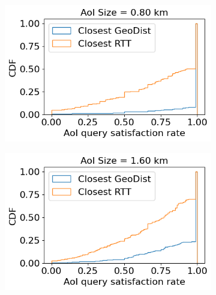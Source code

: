 \begin{figure}
\begin{subfigure}{0.3\textwidth}
  \caption{}
\end{subfigure}
\begin{subfigure}{0.333\textwidth}
  \centering
  \includegraphics[width=\linewidth]{figures/mechanisms/spatial_ctx_mgmt/aoi_satisfaction_rate_cdf_AOI_0.800_km.png}
  \caption{}
\end{subfigure}%
\begin{subfigure}{0.333\textwidth}
  \centering
  \includegraphics[width=\linewidth]{figures/mechanisms/spatial_ctx_mgmt/aoi_satisfaction_rate_cdf_AOI_1.600_km.png}
  \caption{}
\end{subfigure}%
\begin{subfigure}{0.333\textwidth}
  \centering

\end{subfigure}
\end{figure}
